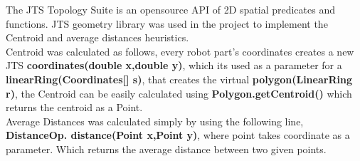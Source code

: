 The JTS Topology Suite is an opensource API of 2D spatial predicates and functions. JTS geometry library was used in the project to implement the Centroid and average distances heuristics. \\

 Centroid was calculated as follows, every robot part's coordinates creates a new JTS \textbf{coordinates(double x,double y)}, which its used as a parameter for a \textbf{linearRing(Coordinates[] s)}, that creates the virtual \textbf{polygon(LinearRing r)}, the Centroid can be easily calculated using \textbf{Polygon.getCentroid()} which returns the centroid as a Point.\\
 
 Average Distances was calculated simply by using the following line, \textbf{DistanceOp. distance(Point x,Point y)}, where point takes coordinate as a parameter. Which returns the average distance between two given points.
 \\
 
 
 